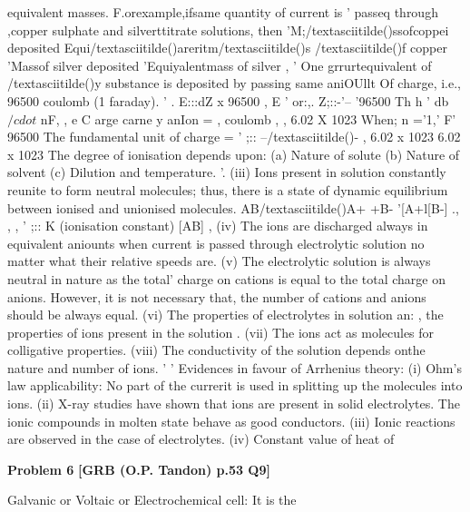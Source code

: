 \begin{problembox}
equivalent masses. F.orexample,ifsame quantity of current is ' 
passeq through ,copper sulphate and silverttitrate solutions, then 
'M;/textasciitilde()ssofcoppei deposited Equi/textasciitilde()areritm/textasciitilde()s /textasciitilde()f copper 
'Massof silver deposited 
'Equiyalentmass of silver 
, ' One grrurtequivalent of /textasciitilde()y substance is deposited by passing 
same aniOUllt Of charge, i.e., 96500 coulomb (1 faraday). 
' 
. E:::dZ x 96500 
, E ' 
or:,. 
Z;::-'--
'96500 
Th 
h 
' db$/cdot$ 
nF, 
, e C arge carne 
y anIon = 
, 
coulomb 
, 
, 
6.02 X 1023 
When; n ='1,' 
F' 
96500 
The fundamental unit of charge = 
' 
;:: --/textasciitilde()-
, 
6.02 x 1023 
6.02 x 1023 
The degree of ionisation depends upon: (a) Nature of solute 
(b) Nature of solvent (c) Dilution and temperature. 
'. (iii) Ions present in solution constantly reunite to form neutral 
molecules; thus, there is a state of dynamic equilibrium between 
ionised and unionised molecules. 
AB/textasciitilde()A+ +B-
'[A+l[B-] 
., 
, 
, 
' 
;:: K (ionisation constant) 
[AB] 
, 
(iv) The ions are discharged always in equivalent aniounts 
when current is passed through electrolytic solution no matter 
what their relative speeds are. 
(v) The electrolytic solution is always neutral in nature as the 
total' charge on cations is equal to the total charge on anions. 
However, it is not necessary that, the number of cations and 
anions should be always equal. 
(vi) The properties of electrolytes in solution an: , the 
properties of ions present in the solution . 
(vii) The ions act as molecules for colligative properties. 
(viii) The conductivity of the solution depends onthe nature 
and number of ions. 
' 
' 
Evidences in favour of Arrhenius theory: (i) Ohm's law 
applicability: No part of the currerit is used in splitting up the 
molecules into ions. (ii) X-ray studies have shown that ions are 
present in solid electrolytes. The ionic compounds in molten state 
behave as good conductors. (iii) Ionic reactions are observed in 
the case of electrolytes. (iv) Constant value of heat of
\end{problembox}

\begin{problembox}
\textbf{Problem 6} \hfill \textbf{[GRB (O.P. Tandon) p.53 Q9]}
\label{q:ext-grb_all_questions-6}

Galvanic or Voltaic or Electrochemical cell: It is the
\end{problembox}

